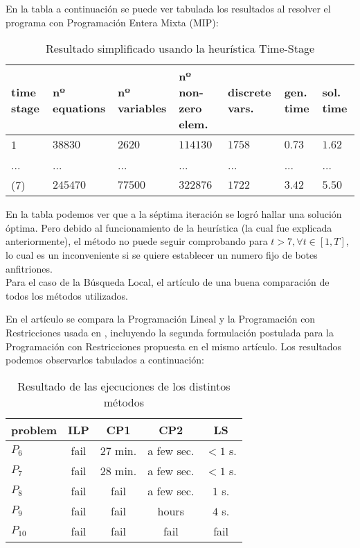 \documentclass[letter, 10pt]{article}
\begin{document}
En la tabla a continuación se puede ver tabulada los resultados al resolver el programa con Programación Entera Mixta (MIP):\\

\begin{table}[h!]
  \begin{center}
	\begin{tabular}{|p{0.8cm}|l|l|p{2cm}|p{1.2cm}|p{0.7cm}|p{0.7cm}|}
	\hline
	time stage & nº equations & nº variables & nº non-zero elem. & discrete vars. & gen. time & sol. time \\ \hline
	1 & $38830$ & $2620$ & $114130$ & $1758$ & $0.73$ & $1.62$ \\ \hline
	... & ... & ... & ... & ... & ... & ... \\ \hline
	(7) & $245470$ & $77500$ & $322876$ & $1722$ & $3.42$ & $5.50$ \\ \hline
	\end{tabular}
  \end{center}
  \caption{Resultado simplificado usando la heurística Time-Stage}
\end{table}

En la tabla podemos ver que a la séptima iteración se logró hallar una solución óptima. Pero debido al funcionamiento de la heurística (la cual fue explicada anteriormente), el método no puede seguir comprobando para $t > 7, \forall t \in [1,T]$, lo cual es un inconveniente si se quiere establecer un numero fijo de botes anfitriones. \\

Para el caso de la Búsqueda Local, el artículo \cite{LocalSearch} de una buena comparación de todos los métodos utilizados.

En el artículo se compara la Programación Lineal y la Programación con Restricciones usada en \cite{FirstPublication}, incluyendo la segunda formulación postulada para la Programación con Restricciones propuesta en el mismo artículo. Los resultados podemos observarlos tabulados a continuación:\\

\begin{table}[h!]
  \begin{center}
	\begin{tabular}{|l||c|c|c|c|}
	\hline
	problem & ILP & CP1 & CP2 & LS \\ \hline
	$P_6$ & fail & 27 min. & a few sec. & $< 1$ s. \\ \hline
	$P_7$ & fail & 28 min. & a few sec. & $< 1$ s. \\ \hline
	$P_8$ & fail & fail & a few sec. & $1$ s. \\ \hline
	$P_9$ & fail & fail & hours & $4$ s. \\ \hline
	$P_10$ & fail & fail & fail & fail \\ \hline
	\end{tabular}
  \end{center}
  \caption{Resultado de las ejecuciones de los distintos métodos}
\end{table}
\end{document}
